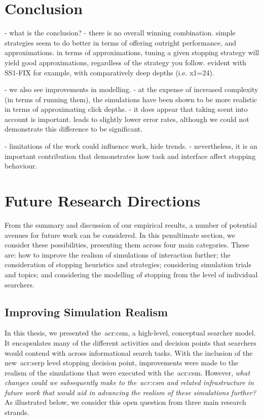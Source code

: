 \section{Conclusion}\label{sec:conclusions:conclusion}










- what is the conclusion?
    - there is no overall winning combination. simple strategies seem to do better in terms of offering outright performance, and approximations. in terms of approximations, tuning a given stopping strategy will yield good approximations, regardless of the strategy you follow. evident with SS1-FIX for example, with comparatively deep depths (i.e. x1=24).

- we also see improvements in modelling.
- at the expense of increased complexity (in terms of running them), the simulations have been shown to be more realistic in terms of approximating click depths.
    - it does appear that taking scent into account is important. leads to slightly lower error rates, although we could not demonstrate this difference to be significant.

- limitations of the work could influence work, hide trends.
- nevertheless, it is an important contribution that demonstrates how task and interface affect stopping behaviour.

\section{Future Research Directions}\label{sec:conclusions:future}
From the summary and discussion of our empirical results, a number of potential avenues for future work can be considered. In this penultimate section, we consider these possibilities, presenting them across four main categories. These are: how to improve the realism of simulations of interaction further; the consideration of stopping heuristics and strategies; considering simulation trials and topics; and considering the modelling of stopping from the level of individual searchers.

\subsection{Improving Simulation Realism}\label{sec:conclusions:future:improving}
In this thesis, we presented the~\gls{acr:csm}, a high-level, conceptual searcher model. It encapsulates many of the different activities and decision points that searchers would contend with across informational search tasks. With the inclusion of the new~\gls{acr:serp} level stopping decision point, improvements were made to the realism of the simulations that were executed with the~\gls{acr:csm}. However, \emph{what changes could we subsequently make to the~\gls{acr:csm} and related infrastructure in future work that would aid in advancing the realism of these simulations further?} As illustrated below, we consider this open question from three main research strands.

